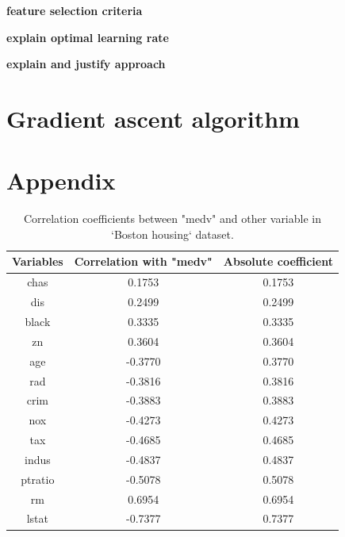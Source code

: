 \documentclass[letterpaper,12pt,twoside,]{pinp}
\begin{document}
\textbf{feature selection criteria}

\textbf{explain optimal learning rate}

\textbf{explain and justify approach}

\hypertarget{gradient-ascent-algorithm}{%
\section{Gradient ascent algorithm}\label{gradient-ascent-algorithm}}

\hypertarget{appendix-1}{%
\section{Appendix}\label{appendix-1}}

\begin{table}[ht]
\centering
\begin{tabular}{ |c|c|c|} 
\hline
\textbf{Variables} & \textbf{Correlation with "medv"} & \textbf{Absolute coefficient}\\
\hline
chas & 0.1753 & 0.1753 \\
dis & 0.2499 & 0.2499 \\
black & 0.3335 & 0.3335 \\
zn & 0.3604 & 0.3604 \\
age & -0.3770 & 0.3770 \\
rad & -0.3816 & 0.3816 \\
crim & -0.3883 & 0.3883 \\
nox & -0.4273 & 0.4273 \\
tax &-0.4685 & 0.4685 \\
indus & -0.4837 & 0.4837 \\
ptratio & -0.5078 & 0.5078 \\
rm & 0.6954 & 0.6954 \\
lstat & -0.7377 & 0.7377 \\
\hline
\end{tabular}
\centering
\caption{Correlation coefficients between "medv" and other variable in `Boston housing` dataset.}
\label{table:corrTab}
\end{table}





\end{document}
